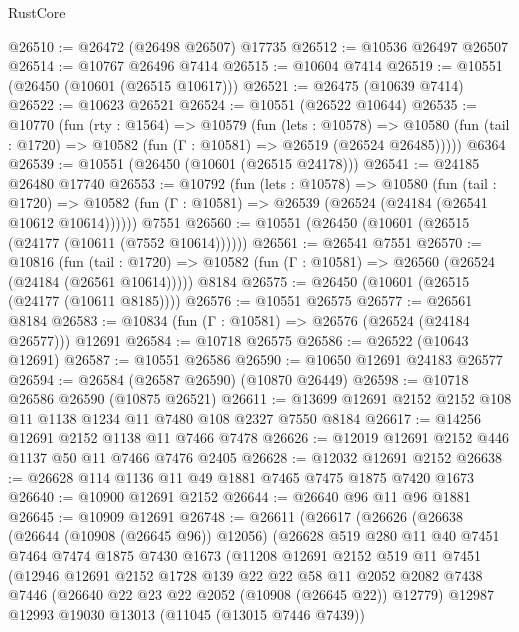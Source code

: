 \begin{lexlean}{RustCore}
\begin{coremodule}
@26510 := @26472 (@26498 @26507) @17735
@26512 := @10536 @26497 @26507
@26514 := @10767 @26496 @7414
@26515 := @10604 @7414
@26519 := @10551 (@26450 (@10601 (@26515 @10617)))
@26521 := @26475 (@10639 @7414)
@26522 := @10623 @26521
@26524 := @10551 (@26522 @10644)
@26535 := @10770
    (fun (rty : @1564) =>
    @10579
      (fun (lets : @10578) =>
      @10580 (fun (tail : @1720) => @10582 (fun (Γ : @10581) => @26519 (@26524 @26485)))))
    @6364
@26539 := @10551 (@26450 (@10601 (@26515 @24178)))
@26541 := @24185 @26480 @17740
@26553 := @10792
    (fun (lets : @10578) =>
    @10580
      (fun (tail : @1720) =>
      @10582 (fun (Γ : @10581) => @26539 (@26524 (@24184 (@26541 @10612 @10614))))))
    @7551
@26560 := @10551 (@26450 (@10601 (@26515 (@24177 (@10611 (@7552 @10614))))))
@26561 := @26541 @7551
@26570 := @10816
    (fun (tail : @1720) => @10582 (fun (Γ : @10581) => @26560 (@26524 (@24184 (@26561 @10614)))))
    @8184
@26575 := @26450 (@10601 (@26515 (@24177 (@10611 @8185))))
@26576 := @10551 @26575
@26577 := @26561 @8184
@26583 := @10834 (fun (Γ : @10581) => @26576 (@26524 (@24184 @26577))) @12691
@26584 := @10718 @26575
@26586 := @26522 (@10643 @12691)
@26587 := @10551 @26586
@26590 := @10650 @12691 @24183 @26577
@26594 := @26584 (@26587 @26590) (@10870 @26449)
@26598 := @10718 @26586 @26590 (@10875 @26521)
@26611 := @13699 @12691 @2152 @2152 @108 @11 @1138 @1234 @11 @7480 @108 @2327 @7550 @8184
@26617 := @14256 @12691 @2152 @1138 @11 @7466 @7478
@26626 := @12019 @12691 @2152 @446 @1137 @50 @11 @7466 @7476 @2405
@26628 := @12032 @12691 @2152
@26638 := @26628 @114 @1136 @11 @49 @1881 @7465 @7475 @1875 @7420 @1673
@26640 := @10900 @12691 @2152
@26644 := @26640 @96 @11 @96 @1881
@26645 := @10909 @12691
@26748 := @26611
    (@26617
      (@26626
        (@26638
          (@26644 (@10908 (@26645 @96)) @12056)
          (@26628
            @519
            @280
            @11
            @40
            @7451
            @7464
            @7474
            @1875
            @7430
            @1673
            (@11208
              @12691
              @2152
              @519
              @11
              @7451
              (@12946
                @12691
                @2152
                @1728
                @139
                @22
                @22
                @58
                @11
                @2052
                @2082
                @7438
                @7446
                (@26640 @22 @23 @22 @2052 (@10908 (@26645 @22)) @12779)
                @12987
                @12993
                @19030
                @13013
                (@11045 (@13015 @7446 @7439))

\end{coremodule}
\end{lexlean}
